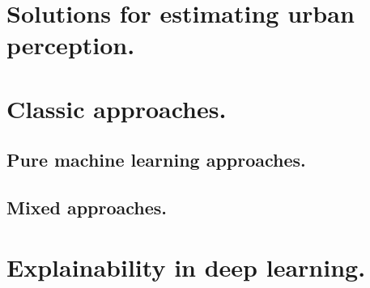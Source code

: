 \section{Solutions for estimating urban perception.}

\section{Classic approaches.}

\subsection{Pure machine learning approaches.}

\subsection{Mixed approaches.}

\section{ Explainability in deep learning.}
